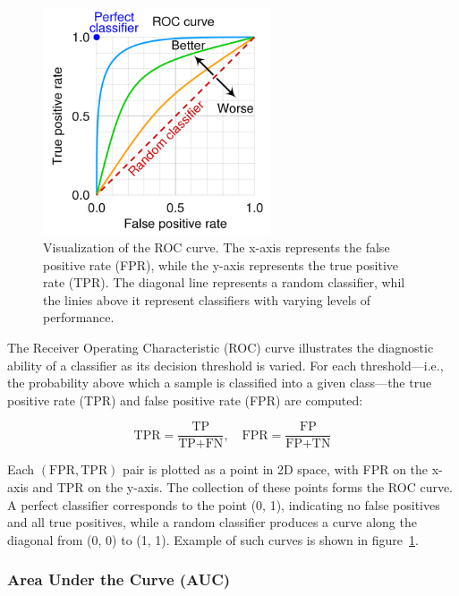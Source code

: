 \documentclass{pracalicmgr}
\begin{document}
\begin{figure}[H]
    \centering
    \includegraphics[width=0.6\textwidth]{src/roc-curveUp.jpg}
    \caption{Visualization of the ROC curve. The x-axis represents the false positive rate (FPR), while the y-axis represents the true positive rate (TPR). The diagonal line represents a random classifier, whil the linies above it represent classifiers with varying levels of performance\cite{ROCEG}.}
    \label{fig:roc_curve}
\end{figure}

The Receiver Operating Characteristic (ROC) curve illustrates the diagnostic ability of a classifier as its decision threshold is varied\cite{GoogleDevelopersROCAUC}. For each threshold—i.e., the probability above which a sample is classified into a given class—the true positive rate (TPR) and false positive rate (FPR) are computed:

\[
\text{TPR} = \frac{\text{TP}}{\text{TP} + \text{FN}}, \quad
\text{FPR} = \frac{\text{FP}}{\text{FP} + \text{TN}}
\]

Each \((\text{FPR}, \text{TPR})\) pair is plotted as a point in 2D space, with FPR on the x-axis and TPR on the y-axis. The collection of these points forms the ROC curve. A perfect classifier corresponds to the point (0, 1), indicating no false positives and all true positives, while a random classifier produces a curve along the diagonal from (0, 0) to (1, 1). Example of such curves is shown in figure~\ref{fig:roc_curve}.


\subsubsection{Area Under the Curve (AUC)}
\end{document}
